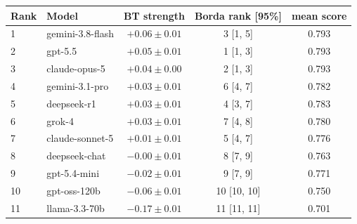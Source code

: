 \begin{tabular}{llccc}
\toprule
Rank & Model & BT strength & Borda rank [95\%] & mean score \\
\midrule
1 & gemini-3.8-flash & $+0.06 \pm 0.01$ & 3 [1, 5] & 0.793 \\
2 & gpt-5.5 & $+0.05 \pm 0.01$ & 1 [1, 3] & 0.793 \\
3 & claude-opus-5 & $+0.04 \pm 0.00$ & 2 [1, 3] & 0.793 \\
4 & gemini-3.1-pro & $+0.03 \pm 0.01$ & 6 [4, 7] & 0.782 \\
5 & deepseek-r1 & $+0.03 \pm 0.01$ & 4 [3, 7] & 0.783 \\
6 & grok-4 & $+0.03 \pm 0.01$ & 7 [4, 8] & 0.780 \\
7 & claude-sonnet-5 & $+0.01 \pm 0.01$ & 5 [4, 7] & 0.776 \\
8 & deepseek-chat & $-0.00 \pm 0.01$ & 8 [7, 9] & 0.763 \\
9 & gpt-5.4-mini & $-0.02 \pm 0.01$ & 9 [7, 9] & 0.771 \\
10 & gpt-oss-120b & $-0.06 \pm 0.01$ & 10 [10, 10] & 0.750 \\
11 & llama-3.3-70b & $-0.17 \pm 0.01$ & 11 [11, 11] & 0.701 \\
\bottomrule
\end{tabular}
